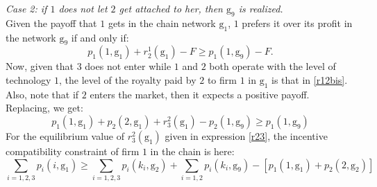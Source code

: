 \documentclass{article}
\begin{document}
\textit{Case 2: if $1$ does not let $2$ get attached to her, then $\text{g}_9$ is realized.}\\
\indent Given the payoff that $1$ gets in the chain network $\text{g}_1$, $1$ prefers it over its profit in the network $\text{g}_9$ if and only if:
\begin{equation*}
    p_1(1,\text{g}_1)+r^1_2(\text{g}_1)-F\geq p_1(1,\text{g}_9) -F. 
\end{equation*}
Now, given that $3$ does not enter while $1$ and $2$ both operate with the level of technology $1$, the level of the royalty paid by $2$ to firm $1$ in $\text{g}_1$ is that in \eqref{r12bis}. Also, note that if $2$ enters the market, then it expects a positive payoff. Replacing, we get: 
\begin{equation*}
    p_1(1,\text{g}_1)+p_2(2,\text{g}_1) +r^2_3(\text{g}_1)- p_2(1,\text{g}_9)\geq p_1(1,\text{g}_9)
\end{equation*}
For the equilibrium value of $r^2_3(\text{g}_1)$ given in expression \eqref{r23}, the incentive compatibility constraint of firm $1$ in the chain is here: 
\begin{equation}
    \sum_{i=1,2,3} p_i(i,\text{g}_1)\geq \sum_{i=1,2,3}p_i(k_i,\text{g}_2)+ \sum_{i=1,2} p_i(k_i,\text{g}_9)-[p_1(1,\text{g}_1)+p_2(2,\text{g}_2)]
\end{equation}
\end{document}
